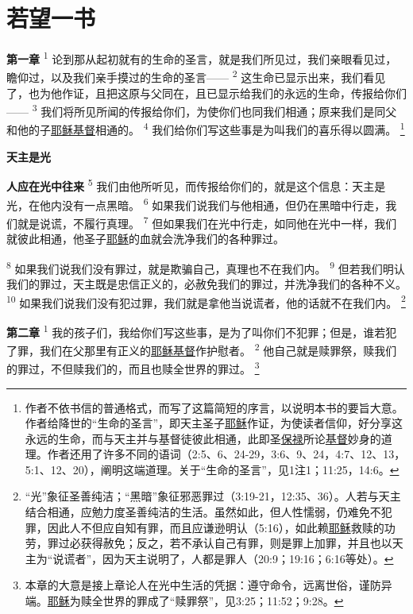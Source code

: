 \chapter*{若望一书}


\textbf{第一章\quad}
\textsuperscript{1}
论到那从起初就有的生命的圣言，就是我们所见过，我们亲眼看见过，瞻仰过，以及我们亲手摸过的生命的圣言——
\textsuperscript{2}
这生命已显示出来，我们看见了，也为他作证，且把这原与父同在，且已显示给我们的永远的生命，传报给你们——
\textsuperscript{3}
我们将所见所闻的传报给你们，为使你们也同我们相通；原来我们是同父和他的子\uline{耶稣}\uline{基督}相通的。
\textsuperscript{4}
我们给你们写这些事是为叫我们的喜乐得以圆满。
\renewcommand\thefootnote{\ding{\numexpr171+\value{footnote}}}
\footnote{作者不依书信的普通格式，而写了这篇简短的序言，以说明本书的要旨大意。作者给降世的“生命的圣言”，即天主圣子\uline{耶稣}作证，为使读者信仰，好分享这永远的生命，而与天主并与基督徒彼此相通，此即圣\uline{保禄}所论\uline{基督}妙身的道理。作者还用了许多不同的语词（2:5、6、24-29，3:6、9、24，4:7、12、13，5:1、12、20），阐明这端道理。关于“生命的圣言”，见1注1；11:25，14:6。}

\begin{center}
	\textbf{\large{\songti 天主是光}}
\end{center}

\textbf{人应在光中往来\quad}
\textsuperscript{5}
我们由他所听见，而传报给你们的，就是这个信息：天主是光，在他内没有一点黑暗。
\textsuperscript{6}
如果我们说我们与他相通，但仍在黑暗中行走，我们就是说谎，不履行真理。
\textsuperscript{7}
但如果我们在光中行走，如同他在光中一样，我们就彼此相通，他圣子\uline{耶稣}的血就会洗净我们的各种罪过。

\textsuperscript{8}
如果我们说我们没有罪过，就是欺骗自己，真理也不在我们内。
\textsuperscript{9}
但若我们明认我们的罪过，天主既是忠信正义的，必赦免我们的罪过，并洗净我们的各种不义。
\textsuperscript{10}
如果我们说我们没有犯过罪，我们就是拿他当说谎者，他的话就不在我们内。
\footnote{“光”象征圣善纯洁；“黑暗”象征邪恶罪过（3:19-21，12:35、36）。人若与天主结合相通，应勉力度圣善纯洁的生活。虽然如此，但人性懦弱，仍难免不犯罪，因此人不但应自知有罪，而且应谦逊明认（5:16），如此赖\uline{耶稣}救赎的功劳，罪过必获得赦免；反之，若不承认自己有罪，则是罪上加罪，并且也以天主为“说谎者”，因为天主说明了，人都是罪人（20:9；19:16；6:16等处）。}

\textbf{第二章\quad}
\textsuperscript{1}
我的孩子们，我给你们写这些事，是为了叫你们不犯罪；但是，谁若犯了罪，我们在父那里有正义的\uline{耶稣}\uline{基督}作护慰者。
\textsuperscript{2}
他自己就是赎罪祭，赎我们的罪过，不但赎我们的，而且也赎全世界的罪过。
\footnote{本章的大意是接上章论人在光中生活的凭据：遵守命令，远离世俗，谨防异端。\uline{耶稣}为赎全世界的罪成了“赎罪祭”，见3:25；11:52；9:28。}

